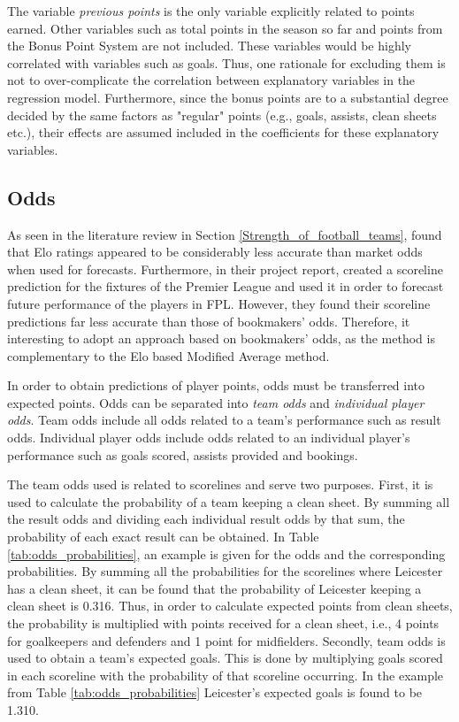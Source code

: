 \newpar 

The variable \textit{previous points} is the only variable explicitly related to points earned. Other variables such as total points in the season so far and points from the Bonus Point System are not included. These variables would be highly correlated with variables such as goals. Thus, one rationale for excluding them is not to over-complicate the correlation between explanatory variables in the regression model. Furthermore, since the bonus points are to a substantial degree decided by the same factors as "regular" points (e.g., goals, assists, clean sheets etc.), their effects are assumed included in the coefficients for these explanatory variables. 


\subsection{Odds}

As seen in the literature review in Section \ref{Strength_of_football_teams}, \cite{Hvattum} found that Elo ratings appeared to be considerably less accurate than market odds when used for forecasts. Furthermore, in their project report, \cite{Gupta} created a scoreline prediction for the fixtures of the Premier League and used it in order to forecast future performance of the players in FPL. However, they found their scoreline predictions far less accurate than those of bookmakers' odds. Therefore, it interesting to adopt an approach based on bookmakers' odds, as the method is complementary to the Elo based Modified Average method.


\newpar

In order to obtain predictions of player points, odds must be transferred into expected points. Odds can be separated into \textit{team odds} and \textit{individual player odds}. Team odds include all odds related to a team's performance such as result odds. Individual player odds include odds related to an individual player's performance such as goals scored, assists provided and bookings. 

\newpar

The team odds used is related to scorelines and serve two purposes. First, it is used to calculate the probability of a team keeping a clean sheet. By summing all the result odds and dividing each individual result odds by that sum, the probability of each exact result can be obtained. In Table \ref{tab:odds_probabilities}, an example is given for the odds and the corresponding probabilities. By summing all the probabilities for the scorelines where Leicester has a clean sheet, it can be found that the probability of Leicester keeping a clean sheet is 0.316. Thus, in order to calculate expected points from clean sheets, the probability is multiplied with points received for a clean sheet, i.e., 4 points for goalkeepers and defenders and 1 point for midfielders. Secondly, team odds is used to obtain a team's expected goals. This is done by multiplying goals scored in each scoreline with the probability of that scoreline occurring. In the example from Table \ref{tab:odds_probabilities} Leicester's expected goals is found to be 1.310.


